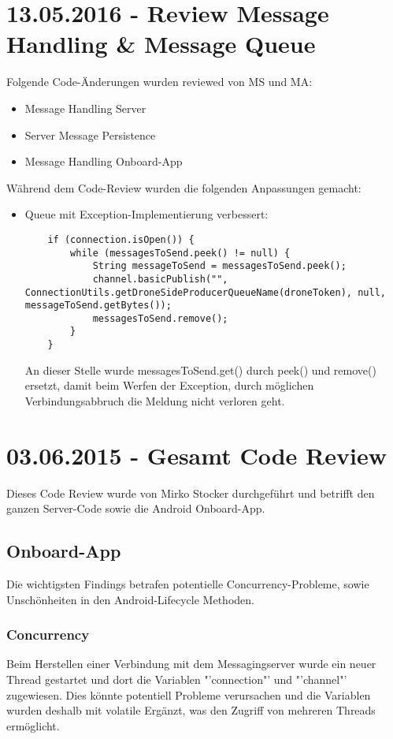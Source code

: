 \section{13.05.2016 - Review Message Handling \& Message Queue}
Folgende Code-Änderungen wurden reviewed von MS und MA:
\begin{itemize}
	\item{Message Handling Server}
	\item{Server Message Persistence}
	\item{Message Handling Onboard-App}
\end{itemize}
Während dem Code-Review wurden die folgenden Anpassungen gemacht:
\begin{itemize}
	\item{Queue mit Exception-Implementierung verbessert:
	\begin{lstlisting}
    if (connection.isOpen()) {
        while (messagesToSend.peek() != null) {
            String messageToSend = messagesToSend.peek();
            channel.basicPublish("", ConnectionUtils.getDroneSideProducerQueueName(droneToken), null, messageToSend.getBytes());
            messagesToSend.remove();
        }
    }
	\end{lstlisting}
	An dieser Stelle wurde messagesToSend.get() durch peek() und remove() ersetzt, damit beim Werfen der Exception, durch möglichen Verbindungsabbruch die Meldung nicht verloren geht.}

\end{itemize}
\section{03.06.2015 - Gesamt Code Review}

Dieses Code Review wurde von Mirko Stocker durchgeführt und betrifft den ganzen Server-Code sowie die Android Onboard-App.

\subsection{Onboard-App}
	 
Die wichtigsten Findings betrafen potentielle Concurrency-Probleme, sowie Unschönheiten in den Android-Lifecycle Methoden.

\subsubsection{Concurrency}

Beim Herstellen einer Verbindung mit dem Messagingserver wurde ein neuer Thread gestartet und dort die Variablen "'connection"' und "'channel"' zugewiesen.
Dies könnte potentiell Probleme verursachen und die Variablen wurden deshalb mit volatile Ergänzt, was den Zugriff von mehreren Threads ermöglicht.

